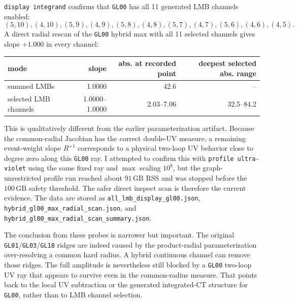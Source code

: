 \documentclass[11pt]{article}
\begin{document}
\texttt{display integrand} confirms that \texttt{GL00} has all 11 generated
LMB channels enabled:
\[
  (5,10),(4,10),(5,9),(4,9),(5,8),(4,8),
  (5,7),(4,7),(5,6),(4,6),(4,5).
\]
A direct radial rescan of the \texttt{GL00} hybrid max with all 11 selected
channels gives slope \(+1.000\) in every channel:
\begin{center}
\scriptsize
\begin{tabular}{lrrr}
\toprule
mode & slope & abs. at recorded point & deepest selected abs. range\\
\midrule
summed LMBs & 1.0000 & 42.6 & --\\
selected LMB channels & 1.0000--1.0000 &
2.03--7.06 & 32.5--84.2\\
\bottomrule
\end{tabular}
\end{center}
This is qualitatively different from the earlier parameterization artifact.
Because the common-radial Jacobian has the correct double-UV measure, a
remaining event-weight slope \(R^{+1}\) corresponds to a physical
two-loop UV behavior close to degree zero along this \texttt{GL00} ray.  I
attempted to confirm this with \texttt{profile ultra-violet} using the same
fixed ray and \(\max\) scaling \(10^8\), but the graph-unrestricted profile
run reached about \(91\,\mathrm{GB}\) RSS and was stopped before the
\(100\,\mathrm{GB}\) safety threshold.  The safer direct inspect scan is
therefore the current evidence.  The data are stored as
\texttt{all\_lmb\_display\_gl00.json},
\texttt{hybrid\_gl00\_max\_radial\_scan.json}, and
\texttt{hybrid\_gl00\_max\_radial\_scan\_summary.json}.

The conclusion from these probes is narrower but important.  The original
\texttt{GL01}/\texttt{GL03}/\texttt{GL18} ridges are indeed caused by the
product-radial parameterization over-resolving a common hard radius.  A
hybrid continuous channel can remove those ridges.  The full amplitude is
nevertheless still blocked by a \texttt{GL00} two-loop UV ray that appears to
survive even in the common-radius measure.  That points back to the local
UV subtraction or the generated integrated-CT structure for \texttt{GL00},
rather than to LMB channel selection.
\end{document}
